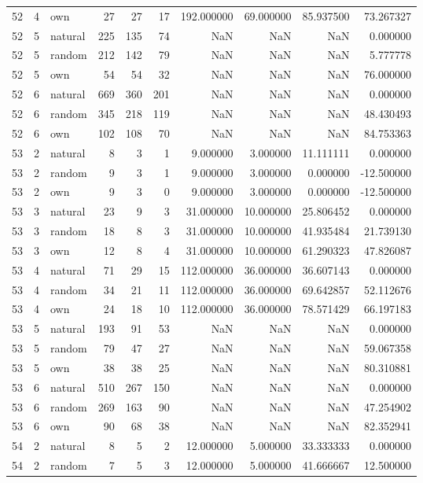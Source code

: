 \begin{table}[htbp]
\begin{tabular}{rrlrrrrrrr}
52 & 4 & own & 27 & 27 & 17 & 192.000000 & 69.000000 & 85.937500 & 73.267327 \\
52 & 5 & natural & 225 & 135 & 74 & NaN & NaN & NaN & 0.000000 \\
52 & 5 & random & 212 & 142 & 79 & NaN & NaN & NaN & 5.777778 \\
52 & 5 & own & 54 & 54 & 32 & NaN & NaN & NaN & 76.000000 \\
52 & 6 & natural & 669 & 360 & 201 & NaN & NaN & NaN & 0.000000 \\
52 & 6 & random & 345 & 218 & 119 & NaN & NaN & NaN & 48.430493 \\
52 & 6 & own & 102 & 108 & 70 & NaN & NaN & NaN & 84.753363 \\
53 & 2 & natural & 8 & 3 & 1 & 9.000000 & 3.000000 & 11.111111 & 0.000000 \\
53 & 2 & random & 9 & 3 & 1 & 9.000000 & 3.000000 & 0.000000 & -12.500000 \\
53 & 2 & own & 9 & 3 & 0 & 9.000000 & 3.000000 & 0.000000 & -12.500000 \\
53 & 3 & natural & 23 & 9 & 3 & 31.000000 & 10.000000 & 25.806452 & 0.000000 \\
53 & 3 & random & 18 & 8 & 3 & 31.000000 & 10.000000 & 41.935484 & 21.739130 \\
53 & 3 & own & 12 & 8 & 4 & 31.000000 & 10.000000 & 61.290323 & 47.826087 \\
53 & 4 & natural & 71 & 29 & 15 & 112.000000 & 36.000000 & 36.607143 & 0.000000 \\
53 & 4 & random & 34 & 21 & 11 & 112.000000 & 36.000000 & 69.642857 & 52.112676 \\
53 & 4 & own & 24 & 18 & 10 & 112.000000 & 36.000000 & 78.571429 & 66.197183 \\
53 & 5 & natural & 193 & 91 & 53 & NaN & NaN & NaN & 0.000000 \\
53 & 5 & random & 79 & 47 & 27 & NaN & NaN & NaN & 59.067358 \\
53 & 5 & own & 38 & 38 & 25 & NaN & NaN & NaN & 80.310881 \\
53 & 6 & natural & 510 & 267 & 150 & NaN & NaN & NaN & 0.000000 \\
53 & 6 & random & 269 & 163 & 90 & NaN & NaN & NaN & 47.254902 \\
53 & 6 & own & 90 & 68 & 38 & NaN & NaN & NaN & 82.352941 \\
54 & 2 & natural & 8 & 5 & 2 & 12.000000 & 5.000000 & 33.333333 & 0.000000 \\
54 & 2 & random & 7 & 5 & 3 & 12.000000 & 5.000000 & 41.666667 & 12.500000 \\

\end{tabular}
\end{table}
